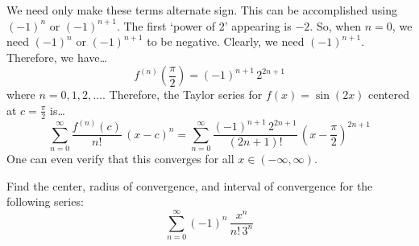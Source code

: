 \documentclass[12pt,letterpaper]{exam}
\begin{document}
\begin{questions}
{We need only make these terms alternate sign. This can be accomplished using $(-1)^n$ or $(-1)^{n+1}$. The first `power of 2' appearing is $-2$. So, when $n= 0$, we need $(-1)^n$ or $(-1)^{n+1}$ to be negative. Clearly, we need $(-1)^{n+1}$. Therefore, we have\dots
	\[
	\boxed{f^{(n)} \left( \frac{\pi}{2} \right)= (-1)^{n+1} \, 2^{2n + 1}}
	\]
where $n= 0, 1, 2, \ldots$. Therefore, the Taylor series for $f(x)= \sin(2x)$ centered at $c= \frac{\pi}{2}$ is\dots
	\[
	\sum_{n=0}^\infty \dfrac{f^{(n)}(c)}{n!} \, (x - c)^n= \boxed{\sum_{n=0}^\infty \dfrac{(-1)^{n+1} \, 2^{2n + 1}}{(2n+1)!} \, \left(x - \dfrac{\pi}{2} \right)^{2n+1}}
	\]
One can even verify that this converges for all $x \in (-\infty, \infty)$.}



\newpage
\question[10] Find the center, radius of convergence, and interval of convergence for the following series: 
	\[
	\sum_{n=0}^\infty (-1)^n \, \dfrac{x^n}{n! \, 3^n}
	\] \pspace





\end{questions}
\end{document}
